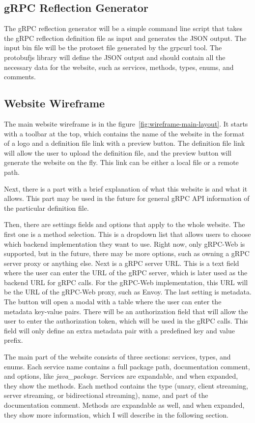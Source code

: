 \subsection{gRPC Reflection Generator}
The gRPC reflection generator will be a simple command line script that takes the gRPC reflection definition file as input and generates the JSON output.
The input bin file will be the protoset file generated by the grpcurl tool.
The protobufjs library will define the JSON output and should contain all the necessary data for the website, such as services, methods, types, enums, and comments.

\subsection{Website Wireframe}
The main website wireframe is in the figure~\ref{fig:wireframe-main-layout}.
It starts with a toolbar at the top, which contains the name of the website in the format of a logo and a definition file link with a preview button.
The definition file link will allow the user to upload the definition file, and the preview button will generate the website on the fly.
This link can be either a local file or a remote path.

Next, there is a part with a brief explanation of what this website is and what it allows.
This part may be used in the future for general gRPC API information of the particular definition file.

Then, there are settings fields and options that apply to the whole website.
The first one is a method selection.
This is a dropdown list that allows users to choose which backend implementation they want to use.
Right now, only gRPC-Web is supported, but in the future, there may be more options, such as owning a gRPC server proxy or anything else.
Next is a gRPC server URL\@.
This is a text field where the user can enter the URL of the gRPC server, which is later used as the backend URL for gRPC calls.
For the gRPC-Web implementation, this URL will be the URL of the gRPC-Web proxy, such as Envoy.
The last setting is metadata.
The button will open a modal with a table where the user can enter the metadata key-value pairs.
There will be an authorization field that will allow the user to enter the authorization token, which will be used in the gRPC calls.
This field will only define an extra metadata pair with a predefined key and value prefix.

The main part of the website consists of three sections: services, types, and enums.
Each service name contains a full package path, documentation comment, and options, like \textit{java\_package}.
Services are expandable, and when expanded, they show the methods.
Each method contains the type (unary, client streaming, server streaming, or bidirectional streaming), name, and part of the documentation comment.
Methods are expandable as well, and when expanded, they show more information, which I will describe in the following section.


